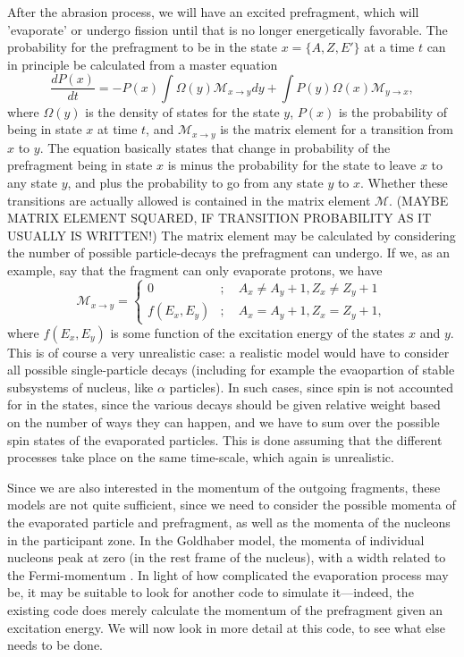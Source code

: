 \documentclass[12pt, a4paper]{article}
\newcommand{\me}{\ensuremath{\mathcal{M}}}
\begin{document}
After the abrasion process, we will have an excited prefragment, which will 'evaporate' or undergo fission until that is no longer energetically favorable. %
The probability for the prefragment to be in the state $x=\{A,Z,E'\}$ at a time $t$ can in principle be calculated from a master equation
\begin{equation}
\frac{dP(x)}{dt} = -P(x)\int\Omega(y) \me_{x\to y} dy +  \int P(y)\Omega(x) \me_{y\to x},
\end{equation}
where $\Omega(y)$ is the density of states for the state $y$, $P(x)$ is the probability of being in state $x$ at time $t$, and $\me_{x\to y}$ is the matrix element for a transition from $x$ to $y$.  The equation basically states that change in probability of the prefragment being in state $x$ is minus the probability for the state to leave $x$ to any state $y$, and plus the probability to go from any state $y$ to $x$. Whether these transitions are actually allowed is contained in the matrix element $\me$. (MAYBE MATRIX ELEMENT SQUARED, IF TRANSITION PROBABILITY AS IT USUALLY IS WRITTEN!)
The matrix element may be calculated by considering the number of possible particle-decays the prefragment can undergo. If we, as an example, say that the fragment can only evaporate protons, we have 
\begin{equation}
\me_{x\to y} = \begin{cases} 0 &;\quad A_x\neq A_y+1, Z_x \neq Z_y+1 \\
f(E_x,E_y) &; \quad A_x = A_y+1, Z_x = Z_y+1,
\end{cases}
\end{equation}
where $f(E_x, E_y)$ is some function of the excitation energy of the states $x$ and $y$. This is of course a very unrealistic case: a realistic model would have to consider all possible single-particle decays (including for example the evaopartion of stable subsystems of nucleus, like $\alpha$ particles). In such cases, since spin is not accounted for in the states, since the various decays should be given relative weight based on the number of ways they can happen, and we have to sum over the possible spin states of the evaporated particles. This is done assuming that the different processes take place on the same time-scale, which again is unrealistic. 

Since we are also interested in the momentum of the outgoing fragments, these models are not quite sufficient, since we need to consider the possible momenta of the evaporated particle and prefragment, as well as the momenta of the nucleons in the participant zone. In the Goldhaber model, the momenta of individual nucleons peak at zero (in the rest frame of the nucleus), with a width related to the Fermi-momentum \cite{gold}. In light of how complicated the evaporation process may be, it may be suitable to look for another code to simulate it---indeed, the existing code does merely calculate the momentum of the prefragment given an excitation energy. We will now look in more detail at this code, to see what else needs to be done.
\end{document}
